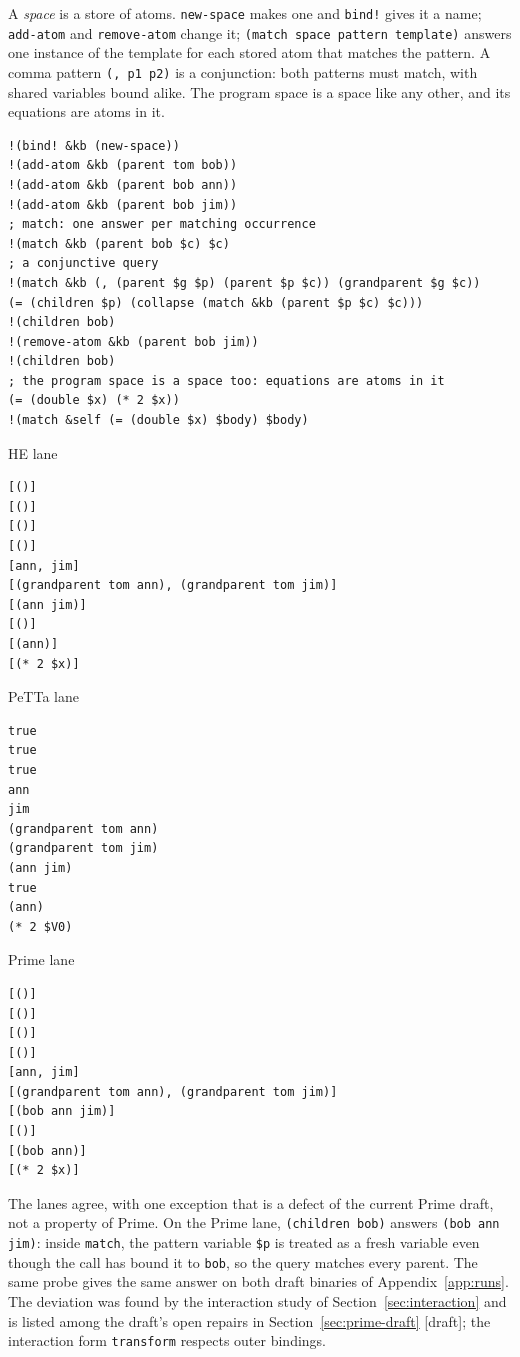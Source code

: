 \documentclass[11pt]{article}
\newcommand{\code}[1]{\texttt{#1}}
\newcommand{\outhead}[1]{{\footnotesize\sffamily #1}\par\vspace{1pt}}
\newcommand{\kind}[1]{\textsf{\small[#1]}}
\begin{document}
A \emph{space} is a store of atoms.  \code{new-space} makes one and
\code{bind!} gives it a name; \code{add-atom} and \code{remove-atom} change it;
\code{(match space pattern template)} answers one instance of the template
for each stored atom that matches the pattern.  A comma pattern
\code{(, p1 p2)} is a conjunction: both patterns must match, with shared
variables bound alike.  The program space is a space like any other, and its
equations are atoms in it.

\begin{lstlisting}[style=metta,caption={Spaces, queries and updates},label={lst:t04}]
!(bind! &kb (new-space))
!(add-atom &kb (parent tom bob))
!(add-atom &kb (parent bob ann))
!(add-atom &kb (parent bob jim))
; match: one answer per matching occurrence
!(match &kb (parent bob $c) $c)
; a conjunctive query
!(match &kb (, (parent $g $p) (parent $p $c)) (grandparent $g $c))
(= (children $p) (collapse (match &kb (parent $p $c) $c)))
!(children bob)
!(remove-atom &kb (parent bob jim))
!(children bob)
; the program space is a space too: equations are atoms in it
(= (double $x) (* 2 $x))
!(match &self (= (double $x) $body) $body)
\end{lstlisting}
\noindent\begin{minipage}[t]{0.32\textwidth}
\outhead{HE lane}
\begin{lstlisting}[style=out]
[()]
[()]
[()]
[()]
[ann, jim]
[(grandparent tom ann), (grandparent tom jim)]
[(ann jim)]
[()]
[(ann)]
[(* 2 $x)]
\end{lstlisting}
\end{minipage}\hfill
\begin{minipage}[t]{0.32\textwidth}
\outhead{PeTTa lane}
\begin{lstlisting}[style=out]
true
true
true
ann
jim
(grandparent tom ann)
(grandparent tom jim)
(ann jim)
true
(ann)
(* 2 $V0)
\end{lstlisting}
\end{minipage}\hfill
\begin{minipage}[t]{0.32\textwidth}
\outhead{Prime lane}
\begin{lstlisting}[style=out]
[()]
[()]
[()]
[()]
[ann, jim]
[(grandparent tom ann), (grandparent tom jim)]
[(bob ann jim)]
[()]
[(bob ann)]
[(* 2 $x)]
\end{lstlisting}
\end{minipage}

\noindent
The lanes agree, with one exception that is a defect of the current Prime
draft, not a property of Prime.  On the Prime lane, \code{(children bob)}
answers \code{(bob ann jim)}: inside \code{match}, the pattern variable
\code{\$p} is treated as a fresh variable even though the call has bound it to
\code{bob}, so the query matches every parent.  The same probe gives the same
answer on both draft binaries of Appendix~\ref{app:runs}.  The deviation was
found by the interaction study of Section~\ref{sec:interaction} and is listed
among the draft's open repairs in Section~\ref{sec:prime-draft} \kind{draft};
the interaction form \code{transform} respects outer bindings.
\end{document}
